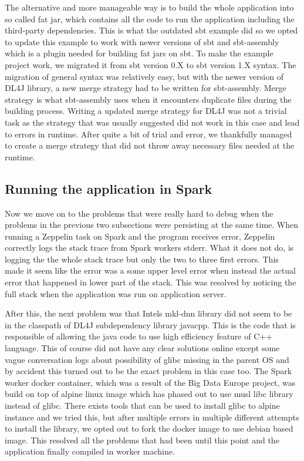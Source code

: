 The alternative and more manageable way is to build the whole application into so called fat jar, which contains all the code to run the application including the third-party dependencies.
This is what the outdated sbt example did so we opted to update this example to work with newer versions of sbt and sbt-assembly which is a plugin needed for building fat jars on sbt.
To make the example project work, we migrated it from sbt version 0.X to sbt version 1.X syntax. 
The migration of general syntax was relatively easy, but with the newer version of DL4J library, a new merge strategy had to be written for sbt-assembly.
Merge strategy is what sbt-assembly uses when it encounters duplicate files during the building process.
Writing a updated merge strategy for DL4J was not a trivial task as the strategy that was usually suggested did not work in this case and lead to errors in runtime.
After quite a bit of trial and error, we thankfully managed to create a merge strategy that did not throw away necessary files needed at the runtime.

\subsection{Running the application in Spark}

Now we move on to the problems that were really hard to debug when the problems in the previous two subsections were persisting at the same time.
When running a Zeppelin task on Spark and the program receives error, Zeppelin correctly logs the stack trace from Spark workers stderr.
What it does not do, is logging the the whole stack trace but only the two to three first errors.
This made it seem like the error was a some upper level error when instead the actual error that happened in lower part of the stack.
This was resolved by noticing the full stack when the application was run on application server.

After this, the next problem was that Intels mkl-dnn library did not seem to be in the classpath of DL4J subdependency library javacpp.
This is the code that is responsible of allowing the java code to use high efficiency feature of C++ language.
This of course did not have any clear solutions online except some vague conversation logs about possibility of glibc missing in the parent OS and by accident this turned out to be the exact problem in this case too.
The Spark worker docker container, which was a result of the Big Data Europe project, was build on top of alpine linux image which has phased out to use musl libc library instead of glibc.
There exists tools that can be used to install glibc to alpine instance and we tried this, but after multiple errors in multiple different attempts to install the library, we opted out to fork the docker image to use debian based image.
This resolved all the problems that had been until this point and the application finally compiled in worker machine.

